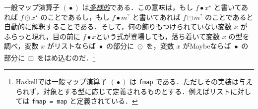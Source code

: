 \documentclass[a4paper]{jsbook}
\def\[{\left[\!\left[}
\def\]{\right]\!\right]}
\newcommand{\programminglanguage}[1]{\textsf{#1}}
\newcommand{\haskell}{\programminglanguage{Haskell}}
\newcommand{\keyword}[1]{{\underline{\emph{#1}}}}
\newcommand{\code}[1]{\texttt{#1}}
\newcommand{\mType}[1]{\mathbf{#1}}
\newcommand{\mListType}[1]{[\mType{#1}]}
\newcommand{\mFunctor}[1]{\textit{\textbf{#1}}}
\newcommand{\mTypeConstructor}[1]{\mathit{#1}} %
\newcommand{\mSpecialTypeClass}[1]{\mathfrak{#1}} %
\newcommand{\mFunctorTypeClass}{\mSpecialTypeClass{Functor}}
\newcommand{\mListWith}[1]{\left[#1\right]}
\newcommand{\mTupleWith}[1]{\left(#1\right)}
\newcommand{\mPureWith}[1]{\langle\!\langle#1\rangle\!\rangle}
\newcommand{\mList}[1]{{#1}^\mathrm{\star}}
\newcommand{\mMaybe}[1]{{#1}^\text{?}}
\DeclareMathOperator{\mMap}{\bullet}
\DeclareMathOperator{\mMapList}{\odot}
\DeclareMathOperator{\mMapMaybe}{\boxdot}
\DeclareMathOperator{\mListTypeConstructor}{\mTypeConstructor{List}}
\DeclareMathOperator{\mMaybeTypeConstructor}{\mTypeConstructor{Maybe}}
\DeclareMathOperator{\mListFunctor}{\mFunctor{List}}
\DeclareMathOperator{\mMaybeFunctor}{\mFunctor{Maybe}}
\newcommand{\mathTypeConstructor}[1]{\mathit{#1}} %
\newcommand{\mathListWith}[1]{\left[#1\right]}
\newcommand{\mathMaybeWith}[1]{\[#1\]}
\newcommand{\mathPureWith}[1]{\left\langle#1\right\rangle}
\DeclareMathOperator{\mathList}{\mathTypeConstructor{List}}
\DeclareMathOperator{\mathMaybe}{\mathTypeConstructor{Maybe}}
\newcommand{\mathGeneralMap}{\mathbin{\cdot}}
\newcommand{\mathMaybeMap}{\mathbin{\boxdot}}
\begin{document}









一般マップ演算子 $(\mMap)$ は\keyword{多様的}である．この意味は，もし $f\mMap\mList{x}$ と書いてあれば $f\mMapList\mList{x}$ のことであるし，もし $f\mMap\mMaybe{m}$ と書いてあれば $f\mMapMaybe\mMaybe{m}$ のことであると自動的に解釈することである．そして，何の飾りもつけられていない変数 $x$ がふらっと現れ，目の前に $f\mMap x$という式が登場しても，落ち着いて変数 $x$ の型を調べ，変数 $x$ がリストならば $\mMap$ の部分に $\mMapList$ を，変数 $x$ がMaybeならば $\mMap$ の部分に $\mMapMaybe$ をはめ込むのだ．\footnote{\haskell では一般マップ演算子 $(\mMap)$ は \code{fmap} である．ただしその実装は与えられず，対象とする型に応じて定義されるものとする．例えばリストに対しては \code{fmap = map} と定義されている．}
\end{document}
